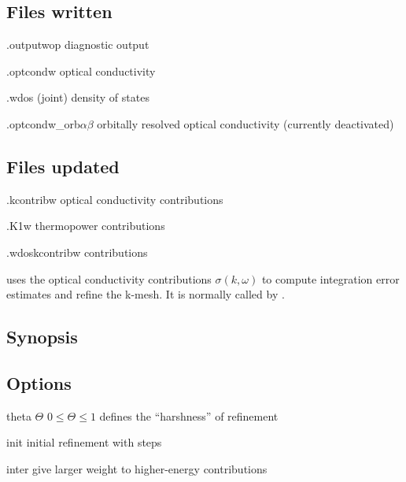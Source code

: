 \subsection{Files written}
\begin{options}
\item[\case.outputwop] diagnostic output 
\item[\case.optcondw] optical conductivity 
\item[\case.wdos] (joint) density of states 
\item[\lvir \case.optcondw\_orb$αβ$] orbitally resolved optical
  conductivity  (currently deactivated)
\end{options}

\subsection{Files updated}
\begin{options}
\item[\case.kcontribw] optical conductivity contributions
\item[\case.K1w] thermopower contributions
\item[\case.wdoskcontribw] \dos contributions
\end{options}



 uses the optical conductivity contributions $σ(k, ω)$ to
compute integration error estimates and refine the k-mesh.  It is
normally called by \woprog.

\subsection{Synopsis}
\begin{usage}
   \case
\end{usage}

\subsection{Options}
\begin{options}
\item[\td theta $Θ$] $0 \le Θ \le 1$ defines the ``harshness'' of
  refinement 
\item[\td init \NI] initial refinement with \NI steps 
\item[\td inter] give larger weight to higher-energy contributions
\end{options}

